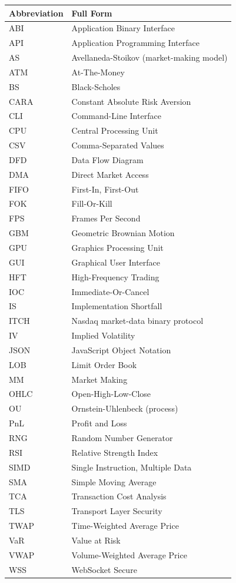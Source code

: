 \documentclass[12pt,oneside,a4paper]{report}
\begin{document}
\begin{longtable}{p{1.4in}p{4in}}
\toprule
\textbf{Abbreviation} & \textbf{Full Form} \\
\midrule
\endhead
ABI & Application Binary Interface \\
API & Application Programming Interface \\
AS & Avellaneda-Stoikov (market-making model) \\
ATM & At-The-Money \\
BS & Black-Scholes \\
CARA & Constant Absolute Risk Aversion \\
CLI & Command-Line Interface \\
CPU & Central Processing Unit \\
CSV & Comma-Separated Values \\
DFD & Data Flow Diagram \\
DMA & Direct Market Access \\
FIFO & First-In, First-Out \\
FOK & Fill-Or-Kill \\
FPS & Frames Per Second \\
GBM & Geometric Brownian Motion \\
GPU & Graphics Processing Unit \\
GUI & Graphical User Interface \\
HFT & High-Frequency Trading \\
IOC & Immediate-Or-Cancel \\
IS & Implementation Shortfall \\
ITCH & Nasdaq market-data binary protocol \\
IV & Implied Volatility \\
JSON & JavaScript Object Notation \\
LOB & Limit Order Book \\
MM & Market Making \\
OHLC & Open-High-Low-Close \\
OU & Ornstein-Uhlenbeck (process) \\
PnL & Profit and Loss \\
RNG & Random Number Generator \\
RSI & Relative Strength Index \\
SIMD & Single Instruction, Multiple Data \\
SMA & Simple Moving Average \\
TCA & Transaction Cost Analysis \\
TLS & Transport Layer Security \\
TWAP & Time-Weighted Average Price \\
VaR & Value at Risk \\
VWAP & Volume-Weighted Average Price \\
WSS & WebSocket Secure \\
\bottomrule
\end{longtable}
\end{document}
